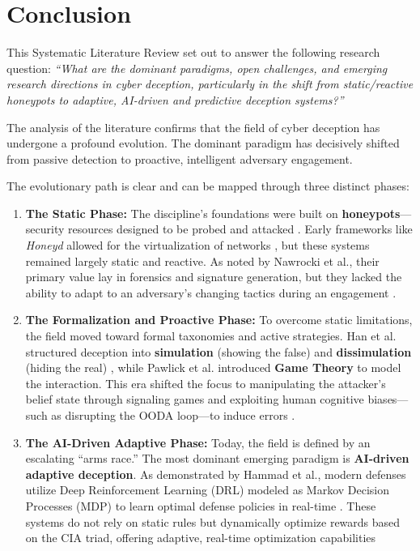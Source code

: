 \section{Conclusion}

This Systematic Literature Review set out to answer the following research question:
\textit{``What are the dominant paradigms, open challenges, and emerging research
    directions in cyber deception, particularly in the shift from static/reactive
    honeypots to adaptive, AI-driven and predictive deception systems?''}

The analysis of the literature confirms that the field of cyber deception has
undergone a profound evolution. The dominant paradigm has decisively shifted from
passive detection to proactive, intelligent adversary engagement.

The evolutionary path is clear and can be mapped through three distinct phases:

\begin{enumerate}
    \item \textbf{The Static Phase:} The discipline's foundations were built on
          \textbf{honeypots}—security resources designed to be probed and attacked
          \cite{spitzner2002honeypots}. Early frameworks like \textit{Honeyd} allowed for
          the virtualization of networks \cite{provos2004virtual}, but these systems
          remained largely static and reactive. As noted by Nawrocki et al., their primary
          value lay in forensics and signature generation, but they lacked the ability to
          adapt to an adversary's changing tactics during an engagement
          \cite{nawrocki2016survey}.

    \item \textbf{The Formalization and Proactive Phase:} To overcome static
          limitations, the field moved toward formal taxonomies and active strategies.
          Han et al. structured deception into \textbf{simulation} (showing the false) and
          \textbf{dissimulation} (hiding the real) \cite{han2018deception}, while Pawlick
          et al. introduced \textbf{Game Theory} to model the interaction. This era shifted
          the focus to manipulating the attacker's belief state through signaling games
          \cite{pawlick2019game} and exploiting human cognitive biases—such as disrupting
          the OODA loop—to induce errors \cite{ferguson2021examining}.

    \item \textbf{The AI-Driven Adaptive Phase:} Today, the field is defined by an
          escalating ``arms race.'' The most dominant emerging paradigm is
          \textbf{AI-driven adaptive deception}. As demonstrated by Hammad et al., modern
          defenses utilize Deep Reinforcement Learning (DRL) modeled as Markov Decision
          Processes (MDP) to learn optimal defense policies in real-time
          \cite{hammad2024deep}. These systems do not rely on static rules but dynamically
          optimize rewards based on the CIA triad, offering adaptive, real-time optimization
          capabilities \cite{hammad2024deep}

\end{enumerate}

